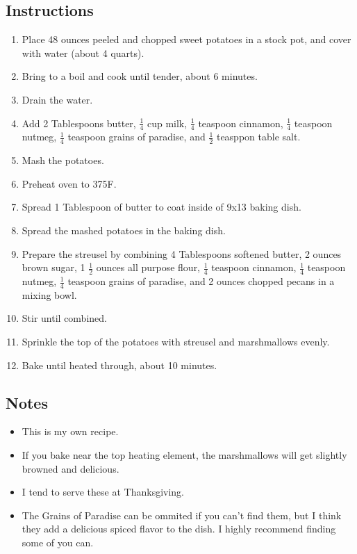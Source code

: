 \begin{multicols}{2}
\subsection*{Instructions}
\begin{enumerate}
    \item Place 48 ounces peeled and chopped sweet potatoes in a stock pot, and cover with water (about 4 quarts).
    \item Bring to a boil and cook until tender, about 6 minutes.
    \item Drain the water.
    \item Add 2 Tablespoons butter, \( \frac{1}{4} \) cup milk, \( \frac{1}{4} \) teaspoon cinnamon, \( \frac{1}{4} \) teaspoon nutmeg, \( \frac{1}{4} \) teaspoon grains of paradise, and \( \frac{1}{2} \) teasppon table salt.
    \item Mash the potatoes.
    \item Preheat oven to 375F.
    \item Spread 1 Tablespoon of butter to coat inside of 9x13 baking dish.
    \item Spread the mashed potatoes in the baking dish.
    \item Prepare the streusel by combining 4 Tablespoons softened butter, 2 ounces brown sugar, 1 \( \frac{1}{2} \) ounces all purpose flour, \( \frac{1}{4} \) teaspoon cinnamon, \( \frac{1}{4} \) teaspoon nutmeg, \( \frac{1}{4} \) teaspoon grains of paradise, and 2 ounces chopped pecans in a mixing bowl.
    \item Stir until combined.
    \item Sprinkle the top of the potatoes with streusel and marshmallows evenly.
    \item Bake until heated through, about 10 minutes.
\end{enumerate}

\subsection*{Notes}
\begin{itemize}
    \item This is my own recipe.
    \item If you bake near the top heating element, the marshmallows will get slightly browned and delicious.
    \item I tend to serve these at Thanksgiving.
    \item The Grains of Paradise can be ommited if you can't find them, but I think they add a delicious spiced flavor to the dish. I highly recommend finding some of you can.
\end{itemize}
\end{multicols}
\clearpage